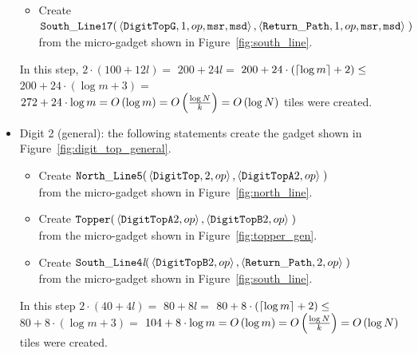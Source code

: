 \begin{itemize}
\begin{itemize}
            \item Create
            $\begin{aligned}[t]
                {\tt South\_Line17}(& \left\langle {\tt DigitTopG}, 1, \inc, {\tt msr}, {\tt msd} \right\rangle,
                                      \left\langle \returnpath,     1, \inc, {\tt msr}, {\tt msd} \right\rangle \;)
            \end{aligned}$\\from the micro-gadget shown in Figure~\ref{fig:south_line}.
        \end{itemize}
        In this step, $2 \cdot \left( 100 + 12l \right) =$
        $200 + 24l =$
        $200 + 24 \cdot \left( \ceil*{\log m} + 2 \right) \leq$
        $200 + 24 \cdot \left( {\log m} + 3 \right) =$
        $272 + 24 \cdot {\log m} = \bigologm$ tiles were created.
        \vspace{0.5cm}


        \item Digit 2 (general): the following statements create the gadget shown in Figure~\ref{fig:digit_top_general}.
        \begin{itemize}
            \item Create
            $\begin{aligned}[t]
                {\tt North\_Line5}(& \left\langle {\tt DigitTop}, 2, \inc \right\rangle,
                                     \left\langle {\tt DigitTopA} 2, \inc \right\rangle \;)
            \end{aligned}$\\from the micro-gadget shown in Figure~\ref{fig:north_line}.

            \item Create
            $\begin{aligned}[t]
                {\tt Topper}(& \left\langle {\tt DigitTopA} 2, \inc \right\rangle,
                               \left\langle {\tt DigitTopB} 2, \inc \right\rangle \;)
            \end{aligned}$\\from the micro-gadget shown in Figure~\ref{fig:topper_gen}.

            \item Create
            $\begin{aligned}[t]
                {\tt South\_Line4\textit{l}}(& \left\langle {\tt DigitTopB} 2, \inc \right\rangle,
                                               \left\langle \returnpath,    2, \inc \right\rangle \;)
            \end{aligned}$\\from the micro-gadget shown in Figure~\ref{fig:south_line}.
        \end{itemize}
        In this step $2 \cdot \left( 40 + 4l \right) =$
        $80 + 8l =$
        $80 + 8 \cdot \left( \ceil*{\log m} + 2 \right) \leq$
        $80 + 8 \cdot \left( {\log m} + 3 \right) =$
        $104 + 8 \cdot {\log m} = \bigologm$ tiles were created.
        \vspace{0.5cm}



\end{itemize}
